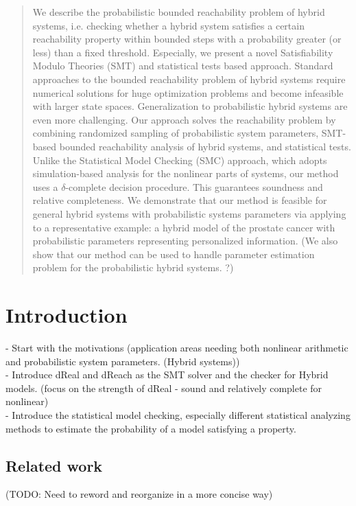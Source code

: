 \documentclass[runningheads,a4paper]{llncs}
\begin{document}
\begin{abstract}
We describe the probabilistic bounded reachability problem of hybrid systems, i.e. checking whether a hybrid system satisfies a certain reachability property within bounded steps with a probability greater (or less) than a fixed threshold. Especially, we present a novel Satisfiability Modulo Theories (SMT) and statistical tests based approach. Standard approaches to the bounded reachability problem of hybrid systems require numerical solutions for huge optimization problems and become infeasible with larger state spaces. Generalization to probabilistic hybrid systems are even more challenging. Our approach solves the reachability problem by combining randomized sampling of probabilistic system parameters, SMT-based bounded reachability analysis of hybrid systems, and statistical tests. Unlike the Statistical Model Checking (SMC) approach, which adopts simulation-based analysis for the nonlinear parts of systems, our method uses a $\delta$-complete decision procedure. This guarantees soundness and relative completeness. We demonstrate that our method is feasible for general hybrid systems with probabilistic systems parameters via applying to a representative example: a hybrid model of the prostate cancer with probabilistic parameters representing personalized information. (We also show that our method can be used to handle parameter estimation problem for the probabilistic hybrid systems. ?)
\end{abstract}


\section{Introduction}
- Start with the motivations (application areas needing both nonlinear arithmetic and probabilistic system parameters. (Hybrid systems))\\
- Introduce dReal and dReach as the SMT solver and the checker for Hybrid models. (focus on the strength of dReal - sound and relatively complete for nonlinear)\\
- Introduce the statistical model checking, especially different statistical analyzing methods to estimate the probability of a model satisfying a property.

\subsection{Related work}
(TODO: Need to reword and reorganize in a more concise way)
\end{document}
